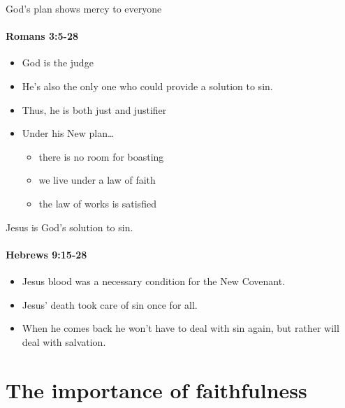 \begin{frame}{God's plan shows mercy to everyone}
\framesubtitle{Romans 3:5-28}

\begin{itemize}
	\item God is the judge
	\item He's also the only one who could provide a solution to sin.
	\item Thus, he is both just and justifier
	\item Under his New plan\ldots
	\begin{itemize}
		\item there is no room for boasting
		\item we live under a law of faith
		\item the law of works is satisfied
	\end{itemize}
\end{itemize}

\end{frame}

\begin{frame}{Jesus is God's solution to sin.}
\framesubtitle{Hebrews 9:15-28}

\begin{itemize}
\item Jesus blood was a necessary condition for the New Covenant.
\item Jesus' death took care of sin once for all.
\item When he comes back he won't have to deal with sin again, but rather will deal with salvation.
\end{itemize}

\end{frame}

\section{The importance of faithfulness}

